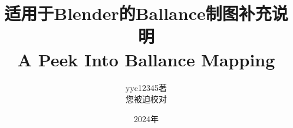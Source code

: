 \documentclass[10pt, a4paper, oneside]{ctexart}
\begin{document}
\title{适用于Blender的Ballance制图补充说明\\A Peek Into Ballance Mapping}
\author{yyc12345著\\您被迫校对}
\date{2024年}
\maketitle
\newpage
 

\newpage

\tableofcontents
\newpage



\newpage


\newpage
\end{document}
